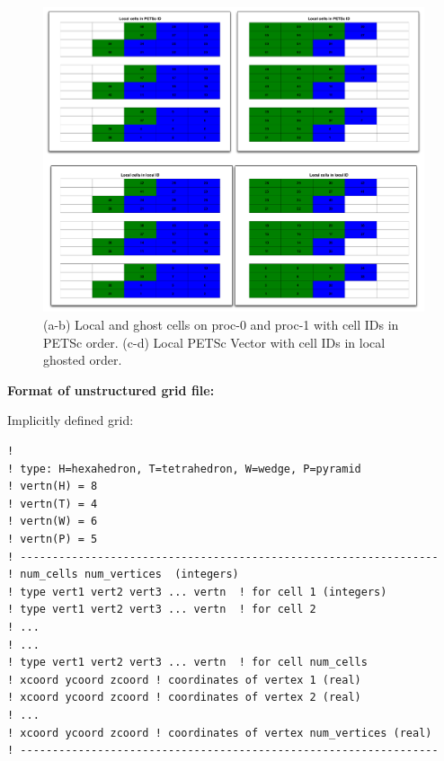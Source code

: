 \begin{figure}[H]\centering
\includegraphics[width=1\textwidth]{./figs/5x4x3_local_domain}
\caption{(a-b) Local and ghost cells on proc-0 and proc-1 with cell IDs in PETSc order.
(c-d) Local PETSc Vector with cell IDs in local ghosted order.}
\label{fig:543_local_vec}
\end{figure}

\clearpage

\begin{mdframed}

\noindent
{\bf Format of unstructured grid file:}

Implicitly defined grid:
\footnotesize
\begin{verbatim}
! 
! type: H=hexahedron, T=tetrahedron, W=wedge, P=pyramid
! vertn(H) = 8
! vertn(T) = 4
! vertn(W) = 6
! vertn(P) = 5
! -----------------------------------------------------------------
! num_cells num_vertices  (integers)
! type vert1 vert2 vert3 ... vertn  ! for cell 1 (integers)
! type vert1 vert2 vert3 ... vertn  ! for cell 2
! ...
! ...
! type vert1 vert2 vert3 ... vertn  ! for cell num_cells
! xcoord ycoord zcoord ! coordinates of vertex 1 (real)
! xcoord ycoord zcoord ! coordinates of vertex 2 (real)
! ...
! xcoord ycoord zcoord ! coordinates of vertex num_vertices (real)
! -----------------------------------------------------------------
\end{verbatim}
\normalsize
\end{mdframed}

\normalsize

